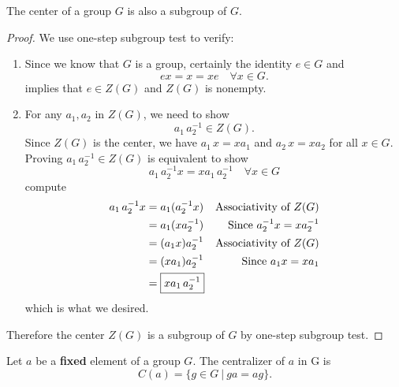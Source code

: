 \begin{lemma}
    The center of a group $G$ is also a subgroup of $G$.
\end{lemma}
\begin{proof}
    We use one-step subgroup test to verify:
    \begin{enumerate}
        \item Since we know that $G$ is a group, certainly the identity $e \in G$ and 
            \[
                ex = x = xe \quad \forall x \in G.
            \]
            implies that $e \in Z(G)$ and $Z(G)$ is nonempty.
        \item For any $a_1, a_2$ in $Z(G)$, we need to show 
            \[
                a_1\, a_2^{-1} \in Z(G).
            \]
            Since $Z(G)$ is the center, we have $a_1\, x = x a_1$ and $a_2\, x = x a_2$ for all $x \in G$.
            Proving $a_1\, a_2^{-1} \in Z(G)$ is equivalent to show
            \[
                a_1\, a_2^{-1} x = x a_1\, a_2^{-1} \quad \forall x \in G
            \]
            compute
            \begin{align*}
                a_1\, a_2^{-1} x &= a_1 (a_2^{-1} x) & \text{Associativity of } Z(G)\\
                &= a_1 (x a_2^{-1}) & \text{Since } a_2^{-1} x = x a_2^{-1}\\
                &= (a_1 x) a_2^{-1} & \text{Associativity of } Z(G)\\
                &= (x a_1)a_2^{-1} & \text{Since } a_1 x = x a_1\\
                &= \fbox{$x a_1\, a_2^{-1}$}
            \end{align*}
            which is what we desired.
    \end{enumerate}

    Therefore the center $Z(G)$ is a subgroup of $G$ by one-step subgroup test.
\end{proof}

\begin{definition}
    Let $a$ be a \textbf{fixed} element of a group $G$. The centralizer of $a$ in G is 
    \begin{equation}
        C(a) = \{ g \in G \> | \> ga = ag\}.
    \end{equation}
\end{definition}

